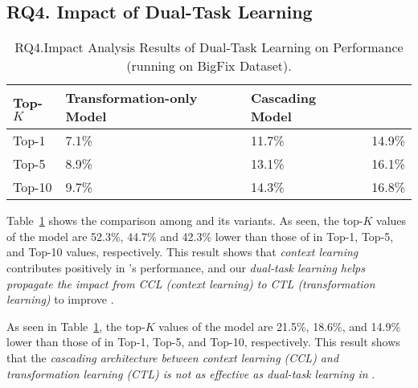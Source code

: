 \subsection{\bf RQ4. Impact of Dual-Task Learning}


\begin{table}[t]
  \caption{RQ4.Impact Analysis Results of Dual-Task Learning on Performance (running on BigFix Dataset).}
  \vspace{-6pt}
	{\small
	  \begin{center}
            \tabcolsep 3pt
			\renewcommand{\arraystretch}{1}
			\begin{tabular}{p{1cm}<{\centering}|p{3.2cm}<{\centering}|p{2cm}<{\centering}|p{1cm}<{\centering}}
				\hline
				Top-$K$ & Transformation-only Model & Cascading Model &  \tool \\			
				\hline
				Top-1   & 7.1\% & 11.7\% & 14.9\% \\ \hline
				Top-5	& 8.9\% & 13.1\% & 16.1\% \\ \hline
				Top-10	& 9.7\% & 14.3\% & 16.8\%\\ \hline
			
				\hline
			\end{tabular}
			\label{fig:rq4_results}
		\end{center}
	}
\end{table}


Table~\ref{fig:rq4_results} shows the comparison among {\tool} and its
variants. As seen, the top-$K$ values of the
 model are 52.3\%, 44.7\% and 42.3\% lower
than those of {\tool} in Top-1, Top-5, and Top-10 values,
respectively. This result shows that {\em context learning}
contributes positively in {\tool}'s performance, and our {\em dual-task
learning helps propagate the impact from CCL (context learning) to CTL
(transformation learning)} to improve {\tool}.



As seen in Table~\ref{fig:rq4_results}, the top-$K$ values of the
 model are 21.5\%, 18.6\%, and 14.9\% lower than those
of {\tool} in Top-1, Top-5, and Top-10, respectively. This result
shows that the {\em cascading architecture between context learning (CCL)
and transformation learning (CTL) is not as effective as 
dual-task learning in {\tool}}.

